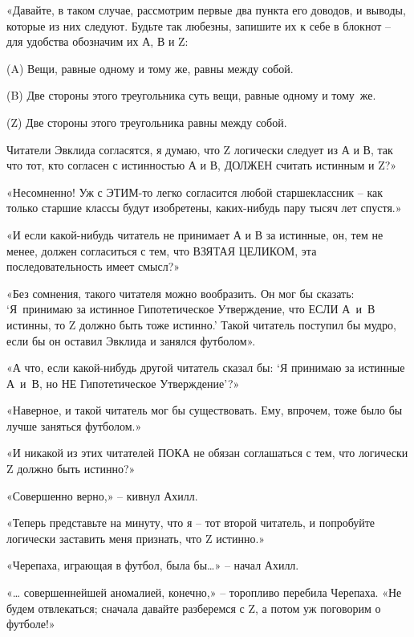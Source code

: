 \documentclass[../main.tex]{subfiles}
\begin{document}
\begin{Dialogue}
«Давайте, в таком случае, рассмотрим первые два пункта его доводов, и выводы, которые из них следуют. Будьте так любезны, запишите их к себе в блокнот \--- для удобства обозначим их А, В и Z:

\begin{statements}
    \item[(A)] Вещи, равные одному и тому же, равны между собой.
    \item[(B)] Две стороны этого треугольника суть вещи, равные одному и тому~же.
    \item[(Z)] Две стороны этого треугольника равны между собой.
\end{statements}

Читатели Эвклида согласятся, я думаю, что Z логически следует из А и В, так что тот, кто согласен с истинностью А и В, ДОЛЖЕН считать истинным и Z?»

«Несомненно! Уж с ЭТИМ-то легко согласится любой старшеклассник \--- как только старшие классы будут изобретены, каких-нибудь пару тысяч лет спустя.»

«И если какой-нибудь читатель не принимает А и В за истинные, он, тем не менее, должен согласиться с тем, что ВЗЯТАЯ ЦЕЛИКОМ, эта последовательность имеет смысл?»

«Без сомнения, такого читателя можно вообразить. Он мог бы сказать: \enquote*{Я~принимаю за истинное Гипотетическое Утверждение, что ЕСЛИ А~и~В истинны, то Z должно быть тоже истинно.} Такой читатель поступил бы мудро, если бы он оставил Эвклида и занялся футболом».

«А что, если какой-нибудь другой читатель сказал бы: \enquote*{Я принимаю за истинные А~и~В, но НЕ Гипотетическое Утверждение}?»

«Наверное, и такой читатель мог бы существовать. Ему, впрочем, тоже было бы лучше заняться футболом.»

«И никакой из этих читателей ПОКА не обязан соглашаться с тем, что логически Z должно быть истинно?»

«Совершенно верно,» \--- кивнул Ахилл.

«Теперь представьте на минуту, что я \--- тот второй читатель, и попробуйте логически заставить меня признать, что Z истинно.»

«Черепаха, играющая в футбол, была бы\ldots» \--- начал Ахилл.

«\ldots{} совершеннейшей аномалией, конечно,» \--- торопливо перебила Черепаха. «Не будем отвлекаться; сначала давайте разберемся с Z, а потом уж поговорим о футболе!»


\end{Dialogue}
\end{document}
